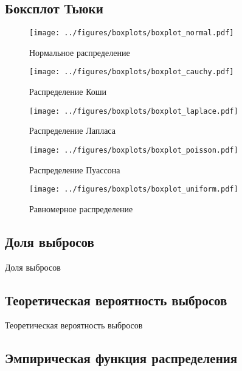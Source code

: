 \documentclass[12pt]{article}
\begin{document}
	\subsection{Боксплот Тьюки}

	\begin{figure}[H]
		\centering
		\texttt{[image: ../figures/boxplots/boxplot\_normal.pdf]}
		\caption{Нормальное распределение}
	\end{figure}
	\begin{figure}[H]
		\centering
		\texttt{[image: ../figures/boxplots/boxplot\_cauchy.pdf]}
		\caption{Распределение Коши}
	\end{figure}
	\begin{figure}[H]
		\centering
		\texttt{[image: ../figures/boxplots/boxplot\_laplace.pdf]}
		\caption{Распределение Лапласа}
	\end{figure}
	\begin{figure}[H]
		\centering
		\texttt{[image: ../figures/boxplots/boxplot\_poisson.pdf]}
		\caption{Распределение Пуассона}
	\end{figure}
	\begin{figure}[H]
		\centering
		\texttt{[image: ../figures/boxplots/boxplot\_uniform.pdf]}
		\caption{Равномерное распределение}
	\end{figure}

	\subsection{Доля выбросов}

	\begin{table}[H]
		\centering
		
		\caption{Доля выбросов}
	\end{table}

	\subsection{Теоретическая вероятность выбросов}

	\begin{table}[H]
		\centering
		
		\caption{Теоретическая вероятность выбросов}
	\end{table}

	\subsection{Эмпирическая функция распределения}
\end{document}
